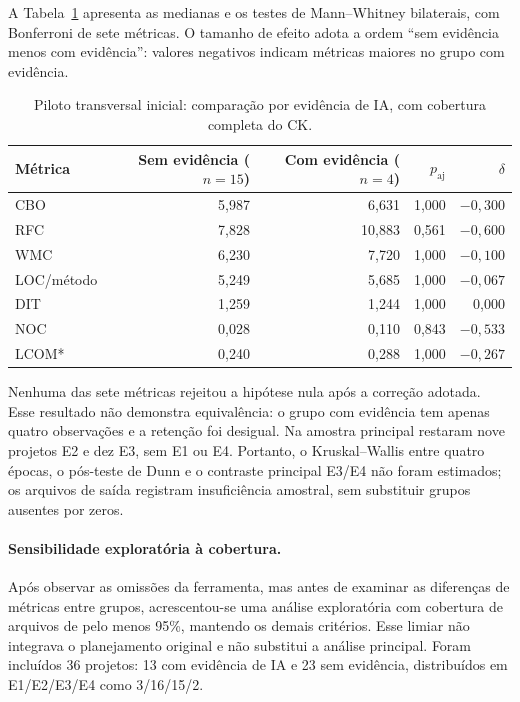 A Tabela~\ref{tab:ck-comparativo-ia} apresenta as medianas e os testes de Mann--Whitney bilaterais, com Bonferroni de sete métricas. O tamanho de efeito adota a ordem ``sem evidência menos com evidência'': valores negativos indicam métricas maiores no grupo com evidência.

\begin{table}[htbp]
\centering
\caption{Piloto transversal inicial: comparação por evidência de IA, com cobertura completa do CK.}
\label{tab:ck-comparativo-ia}
\small
\begin{tabular}{lrrrr}
\hline
Métrica & Sem evidência ($n=15$) & Com evidência ($n=4$) & $p_{\mathrm{aj}}$ & $\delta$ \\
\hline
CBO & 5,987 & 6,631 & 1,000 & $-0,300$ \\
RFC & 7,828 & 10,883 & 0,561 & $-0,600$ \\
WMC & 6,230 & 7,720 & 1,000 & $-0,100$ \\
LOC/método & 5,249 & 5,685 & 1,000 & $-0,067$ \\
DIT & 1,259 & 1,244 & 1,000 & 0,000 \\
NOC & 0,028 & 0,110 & 0,843 & $-0,533$ \\
LCOM* & 0,240 & 0,288 & 1,000 & $-0,267$ \\
\hline
\end{tabular}
\end{table}

Nenhuma das sete métricas rejeitou a hipótese nula após a correção adotada. Esse resultado não demonstra equivalência: o grupo com evidência tem apenas quatro observações e a retenção foi desigual. Na amostra principal restaram nove projetos E2 e dez E3, sem E1 ou E4. Portanto, o Kruskal--Wallis entre quatro épocas, o pós-teste de Dunn e o contraste principal E3/E4 não foram estimados; os arquivos de saída registram insuficiência amostral, sem substituir grupos ausentes por zeros.

\paragraph{Sensibilidade exploratória à cobertura.}
Após observar as omissões da ferramenta, mas antes de examinar as diferenças de métricas entre grupos, acrescentou-se uma análise exploratória com cobertura de arquivos de pelo menos 95\%, mantendo os demais critérios. Esse limiar não integrava o planejamento original e não substitui a análise principal. Foram incluídos 36 projetos: 13 com evidência de IA e 23 sem evidência, distribuídos em E1/E2/E3/E4 como 3/16/15/2.


